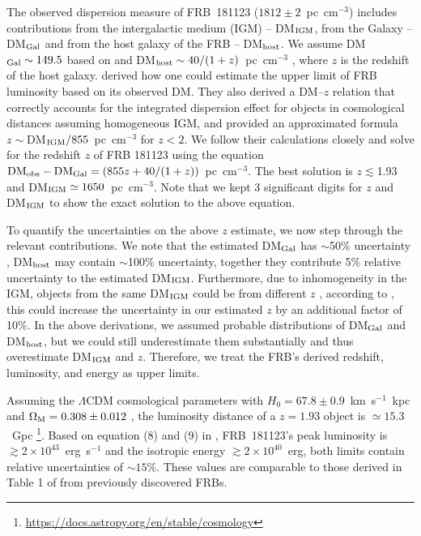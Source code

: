 The observed dispersion measure of FRB~181123 ($1812\pm 2$~pc~cm$^{-3}$) includes  contributions from the intergalactic medium (IGM) -- DM$_{\rm IGM}$, from the Galaxy -- DM$_{\rm Gal}$ and from the host galaxy of the FRB -- DM$_{\rm host}$. We assume DM$_{\rm Gal}\sim149.5$ based on \citet{ymw16} and DM$_{\rm host}\sim 40/(1+z)$~pc~cm$^{-3}$ \citep{xh15,yz16}, where $z$ is the redshift of the host galaxy. 
\citet{zhang18} derived how one could estimate the upper limit of FRB luminosity based on its observed DM. They also derived a DM--$z$ relation that correctly accounts for the integrated dispersion effect for objects in cosmological distances assuming homogeneous IGM, and provided an approximated formula $z\sim$DM$_{\rm IGM} / 855$~pc~cm$^{-3}$ for $z<2$.
We follow their calculations closely and solve for the redshift $z$ of FRB 181123 using the equation ${\rm DM_{obs}-DM_{Gal}} = (855z + 40/(1+z))$~pc~cm$^{-3}$.
The best solution is $z\lesssim $1.93 and DM$_{\rm IGM}\simeq1650$~pc~cm$^{-3}$. 
Note that we kept 3 significant digits for $z$ and DM$_{\rm IGM}$ to show the exact solution to the above equation. 


To quantify the uncertainties on the
above $z$ estimate, we now step through the relevant contributions.
We note that the estimated DM$_{\rm Gal}$ has $\sim$50\% uncertainty \citet{ymw16}, DM$_{\rm host}$ may contain $\sim $100\% uncertainty, together they contribute 5\% relative uncertainty to the estimated DM$_{\rm IGM}$.
Furthermore, due to inhomogeneity in the IGM, objects from the same DM$_{\rm IGM}$ could be from different $z$ \citep{plm+19}, according to \citet{wmb18}, this could increase the uncertainty in our estimated $z$ by an additional factor of 10\%.
In the above derivations, we assumed probable distributions of DM$_{\rm Gal}$ and DM$_{\rm host}$, but we could still underestimate them substantially and thus overestimate DM$_{\rm IGM}$ and $z$. 
Therefore, we treat the FRB's derived redshift, luminosity, and energy as upper limits.

Assuming the $\Lambda$CDM cosmological parameters with $H_0=67.8\pm0.9$~km~s$^{-1}$~kpc %
and $\Omega_{\rm M} =0.308\pm0.012$ \citep{planck16}, the luminosity distance of a $z=1.93$ object is $\simeq15.3$~Gpc \footnote{\url{https://docs.astropy.org/en/stable/cosmology}}.
Based on equation (8) and (9) in \citet{zhang18}, FRB~181123's peak luminosity is $\gtrsim 2\times10^{43}$~erg~s$^{-1}$ and the isotropic energy $\gtrsim 2\times10^{40}$~erg, both limits contain relative uncertainties of $\sim 15$\%.
These values are comparable to those derived in Table 1 of \citet{zhang18} from previously discovered FRBs.

